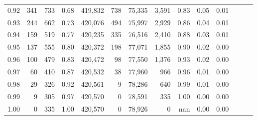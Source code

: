 \begin{tabular}{rrrrrrrrrrrrrr}
0.92 &    341 &    733 &  0.68 &  419,832 &      738 &  75,335 &   3,591 &  0.83 &  0.05 &      0.01 \\
0.93 &    244 &    662 &  0.73 &  420,076 &      494 &  75,997 &   2,929 &  0.86 &  0.04 &      0.01 \\
0.94 &    159 &    519 &  0.77 &  420,235 &      335 &  76,516 &   2,410 &  0.88 &  0.03 &      0.01 \\
0.95 &    137 &    555 &  0.80 &  420,372 &      198 &  77,071 &   1,855 &  0.90 &  0.02 &      0.00 \\
0.96 &    100 &    479 &  0.83 &  420,472 &       98 &  77,550 &   1,376 &  0.93 &  0.02 &      0.00 \\
0.97 &     60 &    410 &  0.87 &  420,532 &       38 &  77,960 &     966 &  0.96 &  0.01 &      0.00 \\
0.98 &     29 &    326 &  0.92 &  420,561 &        9 &  78,286 &     640 &  0.99 &  0.01 &      0.00 \\
0.99 &      9 &    305 &  0.97 &  420,570 &        0 &  78,591 &     335 &  1.00 &  0.00 &      0.00 \\
1.00 &      0 &    335 &  1.00 &  420,570 &        0 &  78,926 &       0 &   nan &  0.00 &      0.00 \\
\bottomrule
\end{tabular}
